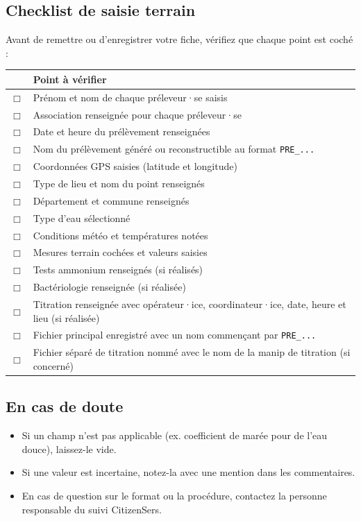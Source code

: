 \documentclass[12pt, a4paper]{article}
\begin{document}
\subsection{Checklist de saisie terrain}

Avant de remettre ou d'enregistrer votre fiche, vérifiez que
chaque point est coché :

\begin{center}
\begin{tabularx}{0.88\linewidth}{C{0.8cm} L{10.5cm}}
  \toprule
  \textbf{} & \textbf{Point à vérifier} \\
  \midrule
  $\Box$ & Prénom et nom de chaque préleveur·se saisis \\
  $\Box$ & Association renseignée pour chaque préleveur·se \\
  $\Box$ & Date et heure du prélèvement renseignées \\
  $\Box$ & Nom du prélèvement généré ou reconstructible au format \texttt{PRE\_...} \\
  $\Box$ & Coordonnées GPS saisies (latitude et longitude) \\
  $\Box$ & Type de lieu et nom du point renseignés \\
  $\Box$ & Département et commune renseignés \\
  $\Box$ & Type d'eau sélectionné \\
  $\Box$ & Conditions météo et températures notées \\
  $\Box$ & Mesures terrain cochées et valeurs saisies \\
  $\Box$ & Tests ammonium renseignés (si réalisés) \\
  $\Box$ & Bactériologie renseignée (si réalisée) \\
  $\Box$ & Titration renseignée avec opérateur·ice, coordinateur·ice, date, heure et lieu (si réalisée) \\
  $\Box$ & Fichier principal enregistré avec un nom commençant par \texttt{PRE\_...} \\
  $\Box$ & Fichier séparé de titration nommé avec le nom de la manip de titration (si concerné) \\
  \bottomrule
\end{tabularx}
\end{center}

\subsection{En cas de doute}

\begin{enresume}
  \begin{itemize}
    \item Si un champ n'est pas applicable (ex. coefficient de marée
          pour de l'eau douce), laissez-le vide.
    \item Si une valeur est incertaine, notez-la avec une mention
          dans les commentaires.
    \item En cas de question sur le format ou la procédure, contactez
          la personne responsable du suivi CitizenSers.
  \end{itemize}
\end{enresume}
\end{document}
